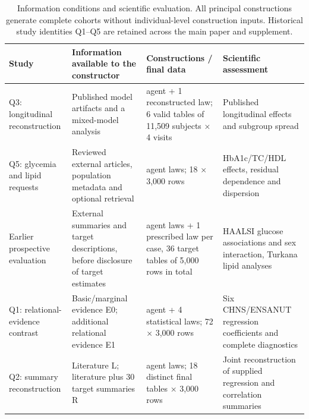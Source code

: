 \documentclass[sigconf,anonymous,review]{acmart}
\begin{document}
\begin{table}[tp]

\caption{Information conditions and scientific evaluation. All principal constructions generate complete cohorts without individual-level construction inputs. Historical study identities Q1–\allowbreak{}Q5 are retained across the main paper and supplement.}

\label{tab:1}

\centering\small

\renewcommand{\arraystretch}{1.12}

\begin{tabularx}{\textwidth}{@{}>{\raggedright\arraybackslash}X>{\raggedright\arraybackslash}X>{\raggedright\arraybackslash}X>{\raggedright\arraybackslash}X@{}}

\toprule

Study & Information available to the constructor & Constructions / final data & Scientific assessment \\

\midrule

Q3: longitudinal reconstruction & Published model artifacts and a mixed-model analysis & 1 agent + 1 reconstructed law; 6 valid tables of 11,509 subjects × 4 visits & Published longitudinal effects and subgroup spread \\

Q5: glycemia and lipid requests & Reviewed external articles, population metadata and optional retrieval & 6 agent laws; 18 × 3,000 rows & HbA1c/\allowbreak{}TC/\allowbreak{}HDL effects, residual dependence and dispersion \\

Earlier prospective evaluation & External summaries and target descriptions, before disclosure of target estimates & 5 agent laws + 1 prescribed law per case, 36 target tables of 5,000 rows in total & HAALSI glucose associations and sex interaction, Turkana lipid analyses \\

Q1: relational-evidence contrast & Basic/\allowbreak{}marginal evidence E0; additional relational evidence E1 & 20 agent + 4 statistical laws; 72 × 3,000 rows & Six CHNS/\allowbreak{}ENSANUT regression coefficients and complete diagnostics \\

Q2: summary reconstruction & Literature L; literature plus 30 target summaries R & 6 agent laws; 18 distinct final tables × 3,000 rows & Joint reconstruction of supplied regression and correlation summaries \\


\end{tabularx}
\end{table}
\end{document}

